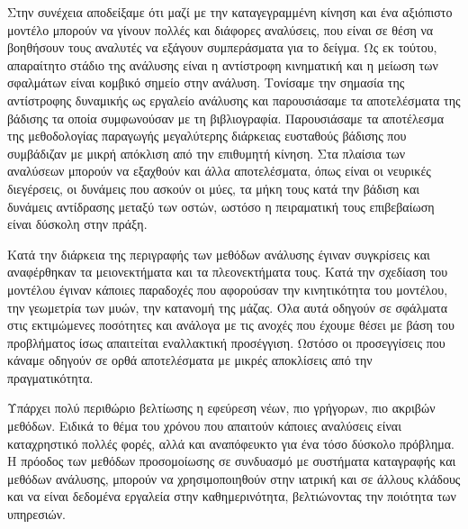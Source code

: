 Στην συνέχεια αποδείξαμε ότι μαζί με την καταγεγραμμένη κίνηση και ένα αξιόπιστο μοντέλο μπορούν να γίνουν πολλές και διάφορες αναλύσεις, που είναι σε θέση να βοηθήσουν τους αναλυτές να εξάγουν συμπεράσματα για το δείγμα. Ως εκ τούτου, απαραίτητο στάδιο της ανάλυσης είναι η αντίστροφη κινηματική και η μείωση των σφαλμάτων είναι κομβικό σημείο στην ανάλυση. Τονίσαμε την σημασία της αντίστροφης δυναμικής ως εργαλείο ανάλυσης και παρουσιάσαμε τα αποτελέσματα της βάδισης τα οποία συμφωνούσαν με τη βιβλιογραφία. Παρουσιάσαμε τα αποτέλεσμα της μεθοδολογίας παραγωγής μεγαλύτερης διάρκειας ευσταθούς βάδισης που συμβάδιζαν με μικρή απόκλιση από την επιθυμητή κίνηση. Στα πλαίσια των αναλύσεων μπορούν να εξαχθούν και άλλα αποτελέσματα, όπως είναι οι νευρικές διεγέρσεις, οι δυνάμεις που ασκούν οι μύες, τα μήκη τους κατά την βάδιση και δυνάμεις αντίδρασης μεταξύ των οστών, ωστόσο η πειραματική τους επιβεβαίωση είναι δύσκολη στην πράξη.

Κατά την διάρκεια της περιγραφής των μεθόδων ανάλυσης έγιναν συγκρίσεις και αναφέρθηκαν τα μειονεκτήματα και τα πλεονεκτήματα τους. Κατά την σχεδίαση του μοντέλου έγιναν κάποιες παραδοχές που αφορούσαν την κινητικότητα του μοντέλου, την γεωμετρία των μυών, την κατανομή της μάζας. Όλα αυτά οδηγούν σε σφάλματα στις εκτιμώμενες ποσότητες και ανάλογα με τις ανοχές που έχουμε θέσει με βάση του προβλήματος ίσως απαιτείται εναλλακτική προσέγγιση. Ωστόσο οι προσεγγίσεις που κάναμε οδηγούν σε ορθά αποτελέσματα με μικρές αποκλίσεις από την πραγματικότητα.

Υπάρχει πολύ περιθώριο βελτίωσης η εφεύρεση νέων, πιο γρήγορων, πιο ακριβών μεθόδων. Ειδικά το θέμα του χρόνου που απαιτούν κάποιες αναλύσεις είναι καταχρηστικό πολλές φορές, αλλά και αναπόφευκτο για ένα τόσο δύσκολο πρόβλημα. Η πρόοδος των μεθόδων προσομοίωσης σε συνδυασμό με συστήματα καταγραφής και μεθόδων ανάλυσης, μπορούν να χρησιμοποιηθούν στην ιατρική και σε άλλους κλάδους και να είναι δεδομένα εργαλεία στην καθημερινότητα, βελτιώνοντας την ποιότητα των υπηρεσιών.
